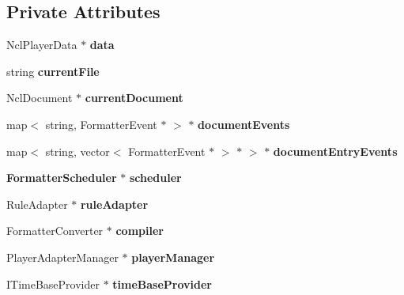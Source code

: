 \subsection*{Private Attributes}
\begin{CompactItemize}
\item 
NclPlayerData $\ast$ {\bf data}\label{classbr_1_1pucrio_1_1telemidia_1_1ginga_1_1ncl_1_1FormatterMediator_a87c99c0bd5db8838b2e32bd1eb10dbd}

\item 
string {\bf currentFile}\label{classbr_1_1pucrio_1_1telemidia_1_1ginga_1_1ncl_1_1FormatterMediator_75a030c1ac7bfa856d51cf4bfaedecb6}

\item 
NclDocument $\ast$ {\bf currentDocument}\label{classbr_1_1pucrio_1_1telemidia_1_1ginga_1_1ncl_1_1FormatterMediator_6c46c7875160408fa4f30b85f2868cc4}

\item 
map$<$ string, FormatterEvent $\ast$ $>$ $\ast$ {\bf documentEvents}\label{classbr_1_1pucrio_1_1telemidia_1_1ginga_1_1ncl_1_1FormatterMediator_44639629eeeaa51f8ceea8447362c34e}

\item 
map$<$ string, vector$<$ FormatterEvent $\ast$ $>$ $\ast$ $>$ $\ast$ {\bf documentEntryEvents}\label{classbr_1_1pucrio_1_1telemidia_1_1ginga_1_1ncl_1_1FormatterMediator_4831a7f353a88e52a24618e3d3b79666}

\item 
{\bf FormatterScheduler} $\ast$ {\bf scheduler}\label{classbr_1_1pucrio_1_1telemidia_1_1ginga_1_1ncl_1_1FormatterMediator_fb7aae6c31924e21d6df13d25c5f2aad}

\item 
RuleAdapter $\ast$ {\bf ruleAdapter}\label{classbr_1_1pucrio_1_1telemidia_1_1ginga_1_1ncl_1_1FormatterMediator_50d33e558d7649f9855c50bfdafee9ff}

\item 
FormatterConverter $\ast$ {\bf compiler}\label{classbr_1_1pucrio_1_1telemidia_1_1ginga_1_1ncl_1_1FormatterMediator_dbbd12a69462a88d0c59de7af28af3ee}

\item 
PlayerAdapterManager $\ast$ {\bf playerManager}\label{classbr_1_1pucrio_1_1telemidia_1_1ginga_1_1ncl_1_1FormatterMediator_4df40f950b752188368d90063891852c}

\item 
ITimeBaseProvider $\ast$ {\bf timeBaseProvider}\label{classbr_1_1pucrio_1_1telemidia_1_1ginga_1_1ncl_1_1FormatterMediator_a768d0b9325a7db85149852491c20fe1}


\end{CompactItemize}
